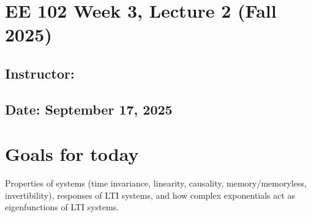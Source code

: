 \documentclass{ee102_notes}
\renewcommand{\releasedate}{September 17, 2025}
\begin{document}
\section*{EE 102 Week 3, Lecture 2 (Fall 2025)}
\subsection*{Instructor: \instructor}
\subsection*{Date: \releasedate}

\section{Goals for today}

Properties of systems (time invariance, linearity, causality, memory/memoryless, invertibility), responses of LTI systems, and how complex exponentials act as eigenfunctions of LTI systems.
\end{document}
